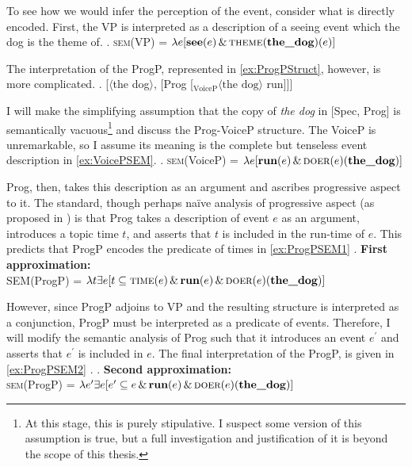 To see how we would infer the perception of the event, consider what is directly encoded.
First, the VP is interpreted as a description of a seeing event which the dog is the theme of.
\ex.\label{ex:VPSEM} \textsc{sem}(VP) = $\lambda e [\textbf{see}(e)\,\&\,\textsc{theme}(\textbf{the\_dog})(e)]$

The interpretation of the ProgP, represented in \cref{ex:ProgPStruct}, however, is more complicated.
\ex.\label{ex:ProgPStruct} [$\langle$the dog$\rangle$, [Prog [$_\text{VoiceP} \langle\text{the dog}\rangle$ run]]]

I will make the simplifying assumption that the copy of \textit{the dog} in [Spec, Prog] is semantically vacuous\footnote{
	At this stage, this is purely stipulative.
	I suspect some version of this assumption is true, but a full investigation and justification of it is beyond the scope of this thesis.
} and discuss the Prog-VoiceP structure.
The VoiceP is unremarkable, so I assume its meaning is the complete but tenseless event description in \cref{ex:VoicePSEM}.
\ex.\label{ex:VoicePSEM} \textsc{sem}(VoiceP) = $\lambda e [\textbf{run}(e)\,\&\,\textsc{doer}(e)(\textbf{the\_dog})]$

Prog, then, takes this description as an argument and ascribes progressive aspect to it.
The standard, though perhaps na\"ive analysis of progressive aspect (as proposed in \cite{klein1994time}) is that Prog takes a description of event $e$ as an argument, introduces a topic time $t$, and asserts that $t$ is included in the run-time of $e$.
This predicts that ProgP encodes the predicate of times in \cref{ex:ProgPSEM1}
\ex.\label{ex:ProgPSEM1} \textbf{First approximation:}\\\textsc{SEM}(ProgP) =  $\lambda t \exists e [t \subseteq \textsc{time}(e)\,\&\,\textbf{run}(e)\,\&\,\textsc{doer}(e)(\textbf{the\_dog})]$

However, since ProgP adjoins to VP and the resulting structure is interpreted as a conjunction, ProgP must be interpreted as a predicate of events.
Therefore, I will modify the semantic analysis of Prog such that it introduces an event $e^{\prime}$ and asserts that $e^{\prime}$ is included in $e$.
The final interpretation of the ProgP, is given in \cref{ex:ProgPSEM2} \parencite[cf.][]{bjorkman2018poster}.
\ex.\label{ex:ProgPSEM2} \textbf{Second approximation:}\\\textsc{sem}(ProgP) =  $\lambda e^{\prime} \exists e [e^{\prime} \subseteq e\,\&\,\textbf{run}(e)\,\&\,\textsc{doer}(e)(\textbf{the\_dog})]$

